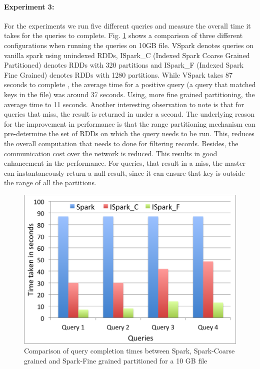 \paragraph{Experiment 3:}
For the experiments we run five different queries and measure the overall time it takes for the queries to complete. 
Fig. \ref{fig:exp7} shows a comparison of three different configurations when running the queries on 10GB file. VSpark denotes queries on vanilla spark using unindexed RDDs, ISpark\_C (Indexed Spark Coarse Grained Partitioned) denotes RDDs with 320 partitions and ISpark\_F (Indexed Spark Fine Grained) denotes RDDs with 1280 partitions. While VSpark takes 87 seconds to complete , the average time for a positive query (a query that matched keys in the file) was around 37 seconds. Using, more fine grained partitioning, the average time to 11 seconds. Another interesting observation to note is that for queries that miss, the result is returned in under a second. The underlying reason for the improvement in performance is that the range partitioning mechanism can pre-determine the set of RDDs on which the query needs to be run. This, reduces the overall computation that needs to done for filtering records. Besides, the communication cost over the network is reduced. This results in good enhancement in the performance. For queries, that result in a miss, the master can instantaneously return a null result, since it can ensure that key is outside the range of all the partitions.

\begin{figure}[!ht]
\caption{Comparison of query completion times between Spark, Spark-Coarse grained and Spark-Fine grained partitioned for a 10 GB file}
\label{fig:exp7}
\includegraphics[scale=0.50]{./images/exp7.png}
\end{figure}

